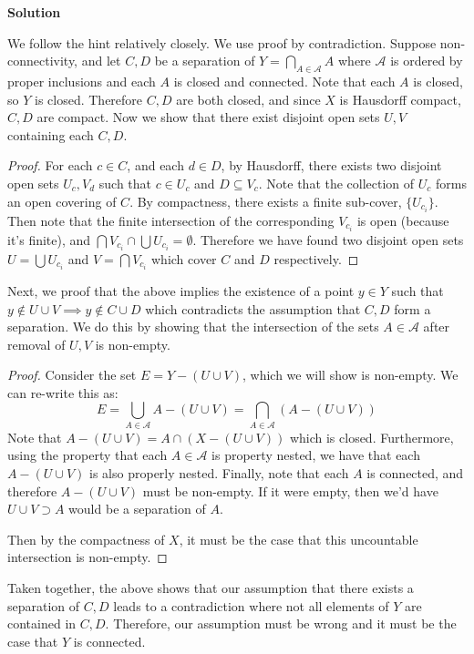 \documentclass[12pt]{article}
\newcounter{AnswerCounter}
\newcounter{SubAnswerCounter}
\newenvironment{answer}[0]{
  \setcounter{SubAnswerCounter}{1}
  \bigskip
  \textbf{Solution \arabic{AnswerCounter}}
  \\
  \begin{small}
}{
  \end{small}
  \stepcounter{AnswerCounter}
}
\begin{document}
\begin{answer}[Page 171, \#11]
We follow the hint relatively closely. We use proof by contradiction. Suppose non-connectivity, and let $C,D$ be a separation of $Y = \bigcap_{A \in \mathcal{A}} A$ where $\mathcal{A}$ is ordered by proper inclusions and each $A$ is closed and connected. Note that each $A$ is closed, so $Y$ is closed. Therefore $C,D$ are both closed, and since $X$ is Hausdorff compact, $C,D$ are compact. Now we show that there exist disjoint open sets $U,V$ containing each $C,D$.
\begin{proof}
For each $c \in C$, and each $d \in D$, by Hausdorff, there exists two disjoint open sets $U_c,V_d$ such that $c \in U_c$ and $D \subseteq V_c$. Note that the collection of $U_c$ forms an open covering of $C$. By compactness, there exists a finite sub-cover, $\{ U_{c_i}\}$. Then note that the finite intersection of the corresponding $V_{c_i}$ is open (because it's finite), and $\bigcap V_{c_i} \cap \bigcup U_{c_i} = \emptyset$. Therefore we have found two disjoint open sets $U = \bigcup U_{c_i}$ and $V = \bigcap V_{c_i}$ which cover $C$ and $D$ respectively.
\end{proof}
Next, we proof that the above implies the existence of a point $y \in Y$ such that $y \notin U \cup V \implies y \notin C \cup D$ which contradicts the assumption that $C,D$ form a separation. We do this by showing that the intersection of the sets $A \in \mathcal{A}$ after removal of $U,V$ is non-empty.
\begin{proof}
Consider the set $E = Y - (U \cup V)$, which we will show is non-empty. We can re-write this as:
$$
E = \bigcup_{A \in \mathcal{A}} A - (U \cup V) = \bigcap_{A \in \mathcal{A}} (A - (U \cup V))
$$
Note that $A - (U \cup V) = A \cap (X - (U \cup V))$ which is closed. Furthermore, using the property that each $A \in \mathcal{A}$ is property nested, we have that each $A - (U \cup V)$ is also properly nested. Finally, note that each $A$ is connected, and therefore $A - (U \cup V)$ must be non-empty. If it were empty, then we'd have $U \cup V \supset A$ would be a separation of $A$.

Then by the compactness of $X$, it must be the case that this uncountable intersection is non-empty.
\end{proof}
Taken together, the above shows that our assumption that there exists a separation of $C,D$ leads to a contradiction where not all elements of $Y$ are contained in $C,D$. Therefore, our assumption must be wrong and it must be the case that $Y$ is connected.
\end{answer}
\end{document}
